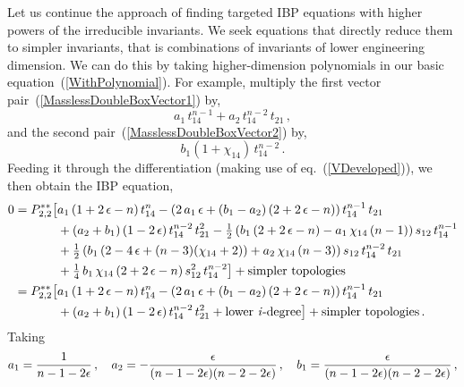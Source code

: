 \documentclass[aps,prd,preprint,groupedaddress,nofootinbib,showpacs,eqsecnum]{revtex4}
\def\eqn#1{eq.~(\ref{#1})}
\def\eps{\epsilon}
\def\Pss#1#2{P^{**}_{#1,#2}}
\begin{document}
Let us continue the approach of finding targeted IBP equations
with higher powers of the irreducible invariants.
We seek equations that directly reduce them to simpler invariants,
that is combinations of invariants of lower engineering dimension.
We can do this by taking higher-dimension polynomials in our
basic equation~(\ref{WithPolynomial}).
For example, multiply the first vector pair~(\ref{MasslessDoubleBoxVector1}) by,
\begin{equation}
a_1 \,t_{14}^{n-1}
+ a_2 \,t_{14}^{n-2}\,t_{21}\,,
\label{HigherPower1Poly1}
\end{equation}
and the second pair~(\ref{MasslessDoubleBoxVector2}) by,
\begin{equation}
b_1 (1+\chi_{14})\, t_{14}^{n-2}\,.
\label{HigherPower1Poly2}
\end{equation}
Feeding it through the differentiation (making use of \eqn{VDeveloped}), 
we then obtain the IBP equation,
\begin{equation}
\begin{aligned}
0 = \Pss22\bigl[&
a_{1}\,(1+2\,\eps-n)\,t_{14}^{n}
-(2\,a_{1}\,\eps+(b_{1}-a_{2})\,(2+2\,\eps-n))\,t_{14}^{n-1}\,t_{21}
\\ &
+(a_{2}+b_{1})\,(1-2\,\eps)\,t_{14}^{n-2}\,t_{21}^{2}
-\tfrac{1}{2}\,(b_{1}\,(2+2\,\eps-n)-a_{1}\,\chi_{14}\,(n-1))\,
s_{12}\,t_{14}^{n-1}
\\ &
+\tfrac{1}{2}\,(b_{1}\,(2-4\,\eps+(n-3)(\chi_{14}+2))
+a_{2}\,\chi_{14}\,(n-3))\,s_{12}\,t_{14}^{n-2}\,t_{21}
\\ &
+\tfrac{1}{4}\,b_{1}\,\chi_{14}\,(2+2\,\eps-n)\,s_{12}^{2}\,t_{14}^{n-2}
\bigr]
+\textrm{simpler\ topologies}
\\ = \Pss22\bigl[&
a_{1}\,(1+2\,\eps-n)\,t_{14}^{n}
-(2\,a_{1}\,\eps+(b_{1}-a_{2})\,(2+2\,\eps-n))\,t_{14}^{n-1}\,t_{21}
\\ &
+(a_{2}+b_{1})\,(1-2\,\eps)\,t_{14}^{n-2}\,t_{21}^{2}
+\textrm{lower\ \ideg{}}\bigr]
+\textrm{simpler\ topologies}\,.
\end{aligned}
\label{HigherPower1}
\end{equation}
Taking
\begin{equation}
a_1 = 
  \frac{1}{n-1-2\e}
  \,,\quad
a_2 = 
  -\frac{\e}{(n-1-2\e)(n-2-2\e)}
  \,,\quad
b_1 = 
  \frac{\e}{(n-1-2\e)(n-2-2\e)}
  \,,
\label{HigherPower1coeffs}
\end{equation}
\end{document}

